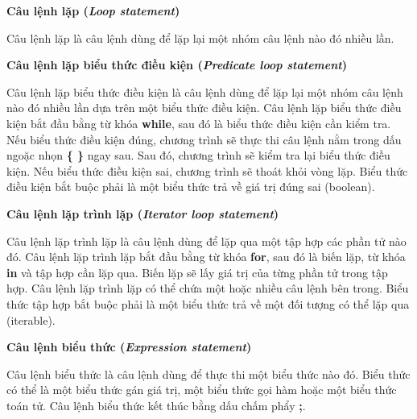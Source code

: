 \noindent\textbf{Câu lệnh lặp (\textit{Loop statement})}

\regexloopstmt

Câu lệnh lặp là câu lệnh dùng để lặp lại một nhóm câu lệnh nào đó nhiều lần.

\noindent\textbf{Câu lệnh lặp biểu thức điều kiện (\textit{Predicate loop statement})}

\regexpredloopstmt

Câu lệnh lặp biểu thức điều kiện là câu lệnh dùng để lặp lại một nhóm câu lệnh nào đó nhiều lần dựa trên một biểu thức điều kiện. Câu lệnh lặp biểu thức điều kiện bắt đầu bằng từ khóa \textbf{while}, sau đó là biểu thức điều kiện cần kiểm tra. Nếu biểu thức điều kiện đúng, chương trình sẽ thực thi câu lệnh nằm trong dấu ngoặc nhọn \textbf{\{ \}} ngay sau. Sau đó, chương trình sẽ kiểm tra lại biểu thức điều kiện. Nếu biểu thức điều kiện sai, chương trình sẽ thoát khỏi vòng lặp. Biểu thức điều kiện bắt buộc phải là một biểu thức trả về giá trị đúng sai (boolean).

\noindent\textbf{Câu lệnh lặp trình lặp (\textit{Iterator loop statement})}

\regexiterloopstmt

Câu lệnh lặp trình lặp là câu lệnh dùng để lặp qua một tập hợp các phần tử nào đó. Câu lệnh lặp trình lặp bắt đầu bằng từ khóa \textbf{for}, sau đó là biến lặp, từ khóa \textbf{in} và tập hợp cần lặp qua. Biến lặp sẽ lấy giá trị của từng phần tử trong tập hợp. Câu lệnh lặp trình lặp có thể chứa một hoặc nhiều câu lệnh bên trong. Biểu thức tập hợp bắt buộc phải là một biểu thức trả về một đối tượng có thể lặp qua (iterable).

\noindent\textbf{Câu lệnh biểu thức (\textit{Expression statement})}            

\regexexprstmt

Câu lệnh biểu thức là câu lệnh dùng để thực thi một biểu thức nào đó. Biểu thức có thể là một biểu thức gán giá trị, một biểu thức gọi hàm hoặc một biểu thức toán tử. Câu lệnh biểu thức kết thúc bằng dấu chấm phẩy \textbf{;}.
